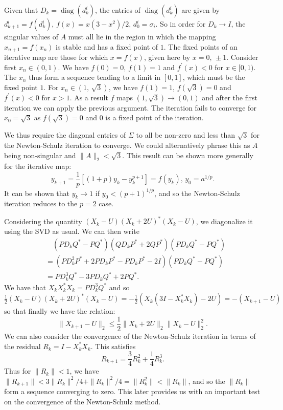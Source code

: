 \documentclass[12pt]{article}
\def\norm#1{\|#1\|}
\def\diag{\mathop{\mathrm{diag}}}     %
\begin{document}
Given that $D_k = \diag(d_k^i)$, the entries of $\diag(d_k^{i})$ are given by
$d^{i}_{k+1} = f(d^{i}_k)$, $f(x) = x(3-x^2)/2\text{, } d_0^{i} = \sigma_i$. So
in order for $D_k \to I$, the singular values of $A$ must all lie in the region
in which the mapping $x_{n+1} = f(x_n)$ is stable and has a fixed point of $1$.
The fixed points of an iterative map are those for which $x = f(x)$, given here
by $x = 0\text{, }\pm 1$.
Consider first $x_n \in (0, 1)$.
We have $f(0) = 0\text{, } f(1) = 1$ and $f^{\prime}(x) < 0$ for $x \in [0, 1)$.
The $x_n$ thus form a sequence tending to a limit in $[0, 1]$,
which must be the fixed point $1$.
For $x_n \in (1\text{, } \sqrt{3})$, we have $f(1) = 1$,
$f(\sqrt{3}) = 0$ and $f^{\prime}(x) < 0$ for $x > 1$.
As a result $f$ maps $(1, \sqrt{3}) \to (0, 1)$ and after the first iteration
we can apply the previous argument.
The iteration fails to converge for $x_0 = \sqrt{3}$ as $f(\sqrt{3}) = 0$ and
$0$ is a fixed point of the iteration.

We thus require the diagonal entries of $\Sigma$ to all be non-zero and less
than $\sqrt{3}$ for the Newton-Schulz iteration to converge. We could
alternatively phrase this as $A$ being non-singular and $\norm{A}_2 < \sqrt{3}$.
This result can be shown more generally for the iterative map:
\begin{equation}
  y_{k+1} = \frac{1}{p}[(1+p)y_k - y_k^{p+1}] = f(y_k)
  \text{, } y_0 = a^{1/p}\text{.}  
\end{equation}
It can be shown \cite{Higham:2008:FM} that $y_k \to 1$ if $y_0 < (p+1)^{1/p}$,
and so the Newton-Schulz iteration reduces to the $p=2$ case.

Considering the quantity $(X_k - U)(X_k+2U)^*(X_k-U)$, we diagonalize it using
the SVD as usual. We can then write
\begin{align*}
  &\quad(PD_kQ^* - PQ^*)(QD_kP^* + 2QP^*)(PD_kQ^* - PQ^*)\\
  & = (PD_k^2P^* + 2PD_kP^* - PD_kP^* - 2I)(PD_kQ^* - PQ^*)\\
  & = PD_k^3Q^* - 3PD_kQ^* + 2PQ^*\text{.}
\end{align*}
We have that $X_kX_k^*X_k = PD_k^3Q^*$ and so
\begin{math}
  \frac{1}{2}(X_k - U)(X_k+2U)^*(X_k-U) = -\frac{1}{2}(X_k(3I-X_k^*X_k) - 2U) = -(X_{k+1}-U)
\end{math}
so that finally we have the relation:
\begin{equation}
  \norm{X_{k+1}-U}_2 \leq \frac{1}{2}
  \norm{X_k+2U}_2\norm{X_k - U}_2^2\text{.}
\end{equation}
We can also consider the convergence of the Newton-Schulz iteration in
terms of the residual $R_k = I-X_k^*X_k$. This satisfies \cite{Higham:2008:FM}
\begin{equation*}
  R_{k+1} = \frac{3}{4}R_k^2 + \frac{1}{4}R_k^3\text{.}
\end{equation*}
Thus for $\norm{R_k} < 1$, we have
$\norm{R_{k+1}} < 3\norm{R_k}^2/4 + \norm{R_k}^2/4 = \norm{R_k^2} < \norm{R_k}$,
and so the $\|R_k\|$ form a sequence converging to zero. This later provides us
with an important test on the convergence of the Newton-Schulz method.
\end{document}

